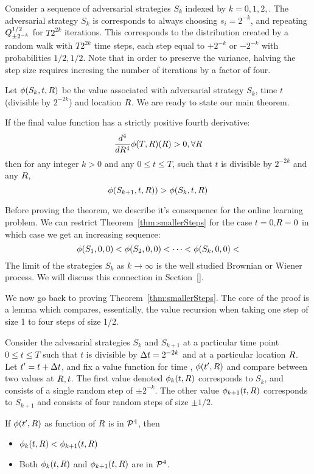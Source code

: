 \documentclass{article}[12pt]
\begin{document}
Consider a sequence of adversarial strategies $S_k$ indexed by
$k=0,1,2,$. The adversarial strategy $S_k$ is corresponds to always
choosing $s_i = 2^{-k}$, and repeating  $Q^{1/2}_{\pm 2^{-k}}$ 
for $T 2^{2k}$ iterations.
This corresponds to the distribution created by a random walk with
$T 2^{2k}$ time steps, each step equal to $+2^{-k}$ or  $-2^{-k}$ with probabilities $1/2,1/2$.
Note that in order to preserve the variance, halving the step size
requires incresing the number of iterations by a factor of four.

Let $\phi(S_k,t,R)$ be the value associated with adversarial
strategy $S_k$, time $t$ (divisible by $2^{-2k}$) and
location $R$. We are ready to state our main theorem.

\begin{theorem}\label{thm:smallerSteps}
  If the final value function has a strictly positive fourth
  derivative:
  $$ \frac{d^4}{d R^4} \phi(T,R)(R) >0, \forall R$$
  then for any integer $k>0$ and any $0 \leq  t \leq T$, such that $t$
  is divisible by
  $2^{-2k}$ and any $R$,
  $$\phi(S_{k+1},t,R)) >  \phi(S_{k},t,R)$$
\end{theorem}

Before proving the theorem, we describe it's
consequence for the online learning problem.
We can restrict Theorem~\ref{thm:smallerSteps} for the
case $t=0$,$R=0$ in which case we get an increasing sequence:
\[
\phi(S_1,0,0) < \phi(S_2,0,0) <\cdots <\phi(S_k,0,0) <
\]
The limit of the strategies $S_k$ as $k \to \infty$ is the well
studied Brownian or Wiener process. We will discuss this connection in Section~\ref{}.

We now go back to proving Theorem~\ref{thm:smallerSteps}. The core of
the proof is a lemma which compares, essentially, the value recursion
when taking one step of size 1 to four steps of size 1/2.


Consider the advesarial strategies $S_k$ and $S_{k+1}$ at a particular
time point $0 \leq t \leq T$ such that $t$ is divisible by
$\Delta t=2^{-2k}$ and at a particular location $R$. Let
$t'=t+\Delta t$, and fix a value
function for time , $\phi(t',R)$ and compare between
two values at $R,t$. The first value denoted
$\phi_k(t,R)$ corresponds to $S_k$, and consists of a single random step of $\pm 2^{-k}$. 
The other value $\phi_{k+1}(t,R)$ corresponds to $S_{k+1}$ and consists of
four random steps of size $\pm 1/2$.

\begin{lemma} \label{lemma:n-strictly-convex}
If $\phi(t',R)$ as function of $R$ is in ${\cal P}^{4}$, then 
\begin{itemize}
\item $\phi_k(t,R) < \phi_{k+1}(t,R)$
\item Both $\phi_k(t,R)$ and $\phi_{k+1}(t,R)$ are in ${\cal P}^{4}$.
\end{itemize}
\end{lemma}
\end{document}
